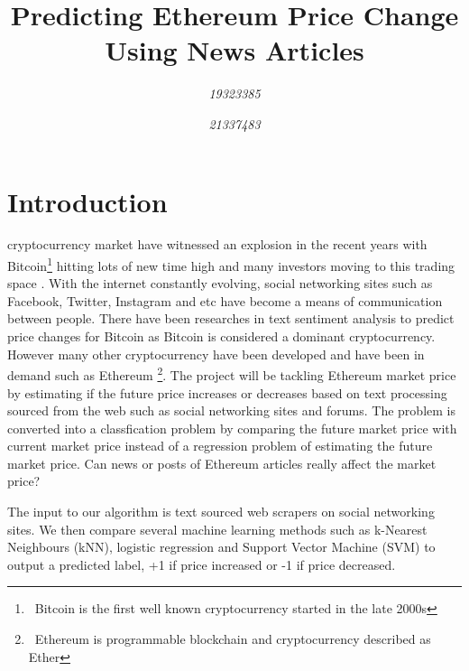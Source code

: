 \documentclass[transmag]{IEEEtran}
\begin{document}
\title{Predicting Ethereum Price Change Using News Articles}

\author{
\textit{19323385}
\and
{}
\textit{21337483}
\and
{}
}




\maketitle
\thispagestyle{plain}
\pagestyle{plain}


\section{Introduction}
 cryptocurrency market have witnessed an explosion in the recent years with Bitcoin\footnote{\ Bitcoin is the first well known cryptocurrency started in the late 2000s} hitting lots of new time high and many investors moving to this trading space \cite{huy2019predicting}. With the internet constantly evolving, social networking sites such as Facebook, Twitter, Instagram and etc have become a means of communication between people. There have been researches in text sentiment analysis to predict price changes for Bitcoin \cite{huy2019predicting}\cite{sattarov2020forecasting} as Bitcoin is considered a dominant cryptocurrency. However many other cryptocurrency have been developed and have been in demand such as Ethereum \footnote{\ Ethereum is programmable blockchain and cryptocurrency described as Ether}. The project will be tackling Ethereum market price by estimating if the future price increases or decreases based on text processing sourced from the web such as social networking sites and forums. The problem is converted into a classfication problem by comparing the future market price with current market price instead of a regression problem of estimating the future market price. Can news or posts of Ethereum articles really affect the market price?

The input to our algorithm is text sourced web scrapers on social networking sites. We then compare several machine learning methods such as k-Nearest Neighbours (kNN), logistic regression and Support Vector Machine (SVM) to output a predicted label, +1 if price increased or -1 if price decreased.
\end{document}
